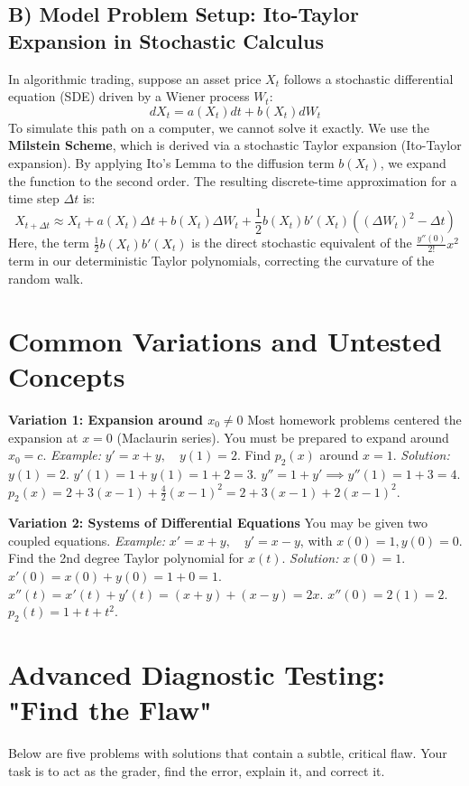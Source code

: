 \documentclass[11pt, letterpaper]{article}
\theoremstyle{definition}
\theoremstyle{remark}
\begin{document}
\subsection{B) Model Problem Setup: Ito-Taylor Expansion in Stochastic Calculus}
In algorithmic trading, suppose an asset price $X_t$ follows a stochastic differential equation (SDE) driven by a Wiener process $W_t$:
\[ dX_t = a(X_t)dt + b(X_t)dW_t \]
To simulate this path on a computer, we cannot solve it exactly. We use the \textbf{Milstein Scheme}, which is derived via a stochastic Taylor expansion (Ito-Taylor expansion). 
By applying Ito's Lemma to the diffusion term $b(X_t)$, we expand the function to the second order. The resulting discrete-time approximation for a time step $\Delta t$ is:
\[ X_{t+\Delta t} \approx X_t + a(X_t)\Delta t + b(X_t)\Delta W_t + \frac{1}{2} b(X_t) b'(X_t) \left( (\Delta W_t)^2 - \Delta t \right) \]
Here, the term $\frac{1}{2} b(X_t) b'(X_t)$ is the direct stochastic equivalent of the $\frac{y''(0)}{2!}x^2$ term in our deterministic Taylor polynomials, correcting the curvature of the random walk.

\newpage
\section{Common Variations and Untested Concepts}

\textbf{Variation 1: Expansion around $x_0 \neq 0$}
Most homework problems centered the expansion at $x=0$ (Maclaurin series). You must be prepared to expand around $x_0 = c$.
\textit{Example:} $y' = x + y, \quad y(1) = 2$. Find $p_2(x)$ around $x=1$.
\textit{Solution:} 
$y(1) = 2$. 
$y'(1) = 1 + y(1) = 1 + 2 = 3$.
$y'' = 1 + y' \implies y''(1) = 1 + 3 = 4$.
$p_2(x) = 2 + 3(x-1) + \frac{4}{2}(x-1)^2 = 2 + 3(x-1) + 2(x-1)^2$.

\textbf{Variation 2: Systems of Differential Equations}
You may be given two coupled equations.
\textit{Example:} $x' = x + y, \quad y' = x - y$, with $x(0)=1, y(0)=0$. Find the 2nd degree Taylor polynomial for $x(t)$.
\textit{Solution:}
$x(0) = 1$.
$x'(0) = x(0) + y(0) = 1 + 0 = 1$.
$x''(t) = x'(t) + y'(t) = (x+y) + (x-y) = 2x$.
$x''(0) = 2(1) = 2$.
$p_2(t) = 1 + t + t^2$.

\section{Advanced Diagnostic Testing: "Find the Flaw"}

Below are five problems with solutions that contain a subtle, critical flaw. Your task is to act as the grader, find the error, explain it, and correct it.
\end{document}
